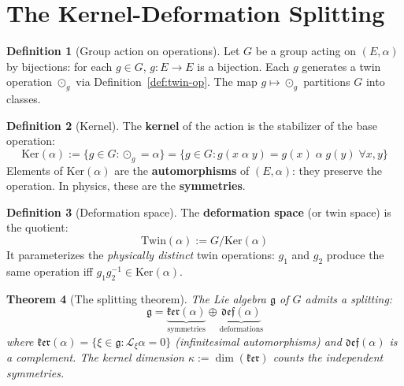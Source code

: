 \documentclass[12pt]{article}
\theoremstyle{plain}
\newtheorem{theorem}{Theorem}[section]
\theoremstyle{definition}
\newtheorem{definition}[theorem]{Definition}
\theoremstyle{remark}
\newcommand{\Ker}{\mathrm{Ker}}
\newcommand{\Twin}{\mathrm{Twin}}
\begin{document}
\section{The Kernel-Deformation Splitting}
\label{sec:kernel}

\begin{definition}[Group action on operations]\label{def:group-action}
Let $G$ be a group acting on $(E, \alpha)$ by bijections: for each $g \in G$, $g: E \to E$ is a bijection. Each $g$ generates a twin operation $\odot_g$ via Definition~\ref{def:twin-op}. The map $g \mapsto \odot_g$ partitions $G$ into classes.
\end{definition}

\begin{definition}[Kernel]\label{def:kernel}
The \textbf{kernel} of the action is the stabilizer of the base operation:
\begin{equation}
\Ker(\alpha) := \{g \in G : \odot_g = \alpha\} = \{g \in G : g(x \;\alpha\; y) = g(x) \;\alpha\; g(y) \;\forall x, y\}
\end{equation}
Elements of $\Ker(\alpha)$ are the \textbf{automorphisms} of $(E, \alpha)$: they preserve the operation. In physics, these are the \textbf{symmetries}.
\end{definition}

\begin{definition}[Deformation space]\label{def:deformation}
The \textbf{deformation space} (or twin space) is the quotient:
\begin{equation}
\Twin(\alpha) := G / \Ker(\alpha)
\end{equation}
It parameterizes the \emph{physically distinct} twin operations: $g_1$ and $g_2$ produce the same operation iff $g_1 g_2^{-1} \in \Ker(\alpha)$.
\end{definition}

\begin{theorem}[The splitting theorem]\label{thm:splitting}
The Lie algebra $\mathfrak{g}$ of $G$ admits a splitting:
\begin{equation}\label{eq:splitting}
\boxed{\mathfrak{g} = \underbrace{\mathfrak{ker}(\alpha)}_{\text{symmetries}} \oplus \underbrace{\mathfrak{def}(\alpha)}_{\text{deformations}}}
\end{equation}
where $\mathfrak{ker}(\alpha) = \{\xi \in \mathfrak{g} : \mathcal{L}_\xi\alpha = 0\}$ (infinitesimal automorphisms) and $\mathfrak{def}(\alpha)$ is a complement. The kernel dimension $\kappa := \dim(\mathfrak{ker})$ counts the independent symmetries.
\end{theorem}
\end{document}
